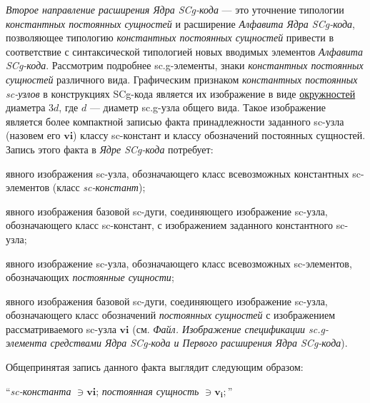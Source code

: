\textit{Второе направление расширения Ядра SCg-кода} --- это уточнение типологии \textit{константных постоянных сущностей} и расширение \textit{Алфавита Ядра SCg-кода\scnsupergroupsign}, позволяющее типологию \textit{константных постоянных сущностей} привести в соответствие с синтаксической типологией новых вводимых элементов \textit{Алфавита SCg-кода\scnsupergroupsign}. Рассмотрим подробнее sc.g-элементы, знаки \textit{константных постоянных сущностей} различного вида. Графическим признаком \textit{константных постоянных sc-узлов} в конструкциях SCg-кода является их изображение в виде \uline{окружностей} диаметра $3d$, где $d$ --- диаметр sc.g-узла общего вида. Такое изображение является более компактной записью факта принадлежности заданного sc-узла (назовем его $\bm{vi}$) классу sc-констант и классу обозначений постоянных сущностей. Запись этого факта в \textit{Ядре SCg-кода} потребует:
\begin{textitemize}
	\item явного изображения sc-узла, обозначающего класс всевозможных константных sc-элементов (класс \textit{sc-констант});  
	\item явного изображения базовой sc-дуги, соединяющего изображение sc-узла, обозначающего класс sc-констант, с изображением заданного константного sc-узла; 
	\item явного изображение sc-узла, обозначающего класс всевозможных sc-элементов, обозначающих \textit{постоянные сущности};
	\item явного изображения базовой sc-дуги, соединяющего изображение sc-узла, обозначающего класс обозначений \textit{постоянных сущностей} с изображением рассматриваемого sc-узла $\bm{vi}$ (см. \textit{Файл. Изображение спецификации sc.g-элемента средствами \textit{Ядра SCg-кода} и \textit{Первого расширения Ядра SCg-кода}}).
\end{textitemize}

\bigskip
Общепринятая запись данного факта выглядит следующим образом:

``\textit{sc-константа} $\ni \bm{vi}$; \textit{постоянная сущность} $\ni \bm{v_i};$''
\bigskip

